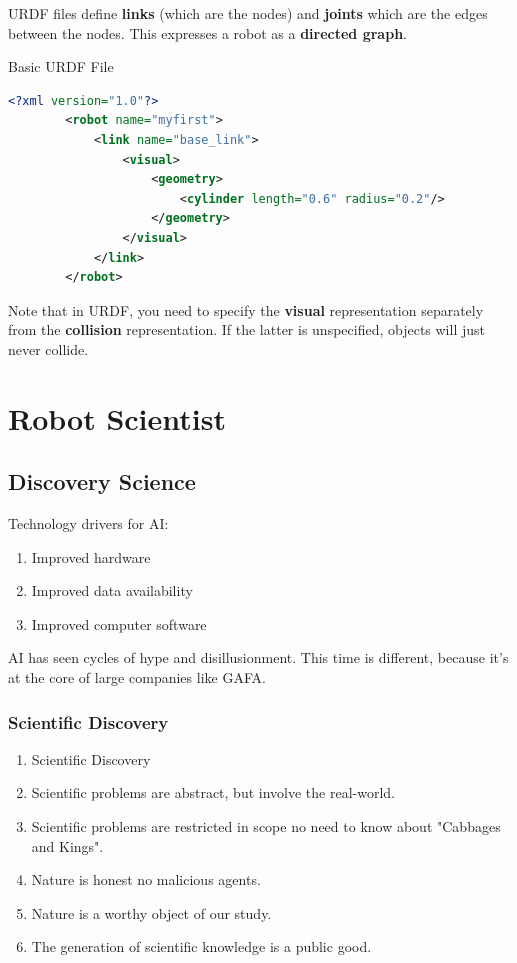 URDF files define \textbf{links} (which are the nodes) and \textbf{joints} which are the edges between the nodes. This expresses a robot as a \textbf{directed graph}.

\begin{listing}
    \label{lis:URDF}
    \caption{Basic URDF File}
    \begin{lstlisting}[language=xml]
    <?xml version="1.0"?>
        <robot name="myfirst">
            <link name="base_link">
                <visual>
                    <geometry>
                        <cylinder length="0.6" radius="0.2"/>
                    </geometry>
                </visual>
            </link>
        </robot>\end{lstlisting}\end{listing}

Note that in URDF, you need to specify the \textbf{visual} representation separately from the \textbf{collision} representation. If the latter is unspecified, objects will just never collide.


\section{Robot Scientist}

\subsection{Discovery Science}

Technology drivers for AI:
\begin{enumerate}
	\item Improved hardware
	\item Improved data availability
	\item Improved computer software
\end{enumerate}

AI has seen cycles of hype and disillusionment. This time is different, because it's at the core of large companies like GAFA.

\subsubsection{Scientific Discovery}

\begin{enumerate}
	\item Scientific Discovery
	\item Scientific problems are abstract, but involve the real-world.
	\item Scientific problems are restricted in scope no need to know about "Cabbages and Kings".
	\item Nature is honest no malicious agents.
	\item Nature is a worthy object of our study.
	\item The generation of scientific knowledge is a public good.
\end{enumerate}

